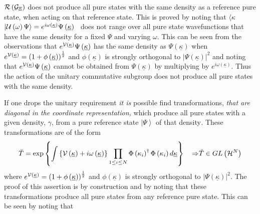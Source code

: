 ${\cal R}\left( {\cal G}_{\Xi }\right) $ does not produce all pure states
with the same density as a reference pure state, when acting on that
reference state. This is proved by noting that $\langle $\underline{$\kappa $%
}${\bf |}{\cal U}\left( \omega \right) \Psi \rangle =e^{i\omega \left( 
\underline{\kappa }\right) }\Psi \left( \underline{\kappa }\right) $ \ does
not range over all pure state wavefunctions that have the same density for a
fixed $\Psi $ and varying $\omega .$ This can be seen from the observations
that $e^{{\cal V}\left( \underline{\kappa }\right) }\Psi \left( \underline{%
\kappa }\right) $ has the same density as $\Psi \left( \underline{\kappa }%
\right) $ when $e^{{\cal V}\left( \underline{\kappa }\right) }=\left( 1+\phi
\left( \underline{\kappa }\right) \right) ^{\frac{1}{2}}$ and $\phi \left( 
\underline{\kappa }\right) $ is strongly orthogonal to $\left| \Psi \left( 
\underline{\kappa }\right) \right| ^{2}$ and noting that $e^{{\cal V}\left( 
\underline{\kappa }\right) }\Psi \left( \underline{\kappa }\right) $ cannot
be obtained from $\Psi \left( \underline{\kappa }\right) $ by multiplying by 
$e^{i\omega \left( \underline{\kappa }\right) }.$ Thus the action of the
unitary commutative subgroup does not produce all pure states with the same
density.

If one drops the unitary requirement {\it it is} possible find
transformations, {\it that are diagonal in the coordinate representation, }%
which produce all pure states with a given density, $\gamma $, from a pure
reference state $\left| \Psi \right\rangle $ of that density{\it . }These
transformations are of the form%
\begin{equation}
\breve{T}=\exp \left\{ \int \left\{ {\cal V}\left( \underline{\kappa }%
\right) +i\omega \left( \underline{\kappa }\right) \right\} \prod_{1\leq
\iota \leq N}\Phi \left( \kappa _{i}\right) ^{\dagger }\Phi \left( \kappa
_{i}\right) d\underline{\kappa }\right\} {\bf \quad \Rightarrow }\breve{T}%
\in GL\left( {\cal H}^{N}\right)
\end{equation}%
where $e^{{\cal V}\left( \underline{\kappa }\right) }=\left( 1+\phi \left( 
\underline{\kappa }\right) \right) ^{\frac{1}{2}}$ and $\phi \left( 
\underline{\kappa }\right) $ is strongly orthogonal to $\left| \Psi \left( 
\underline{\kappa }\right) \right| ^{2}$. The proof of this assertion is by
construction and by noting that these transformations produce all pure
states from any reference pure state. This can be seen by noting that

